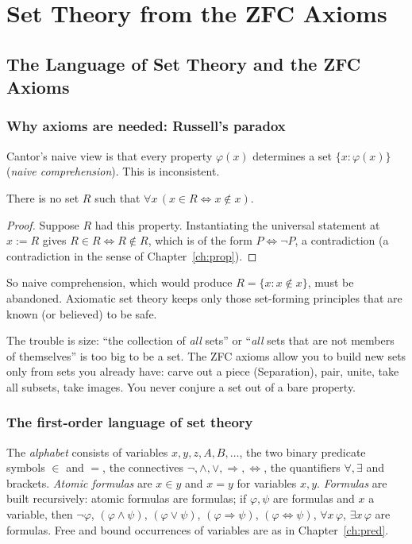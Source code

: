 \part{Set Theory from the ZFC Axioms}

\chapter{The Language of Set Theory and the ZFC Axioms}\label{ch:language}

\section{Why axioms are needed: Russell's paradox}

Cantor's naive view is that every property $\varphi(x)$ determines a set $\{x:\varphi(x)\}$ (\emph{naive comprehension}). This is inconsistent.

\begin{theorem}[Russell]\label{thm:russell}
	There is no set $R$ such that $\forall x\,(x\in R\Leftrightarrow x\notin x)$.
\end{theorem}
\begin{proof}
	Suppose $R$ had this property. Instantiating the universal statement at $x:=R$ gives $R\in R\Leftrightarrow R\notin R$, which is of the form $P\Leftrightarrow\neg P$, a contradiction (a contradiction in the sense of Chapter~\ref{ch:prop}).
\end{proof}

So naive comprehension, which would produce $R=\{x:x\notin x\}$, must be abandoned. Axiomatic set theory keeps only those set-forming principles that are known (or believed) to be safe.

\begin{intuition}
	The trouble is size: ``the collection of \emph{all} sets'' or ``\emph{all} sets that are not members of themselves'' is too big to be a set. The ZFC axioms allow you to build new sets only from sets you already have: carve out a piece (Separation), pair, unite, take all subsets, take images. You never conjure a set out of a bare property.
\end{intuition}

\section{The first-order language of set theory}

\begin{definition}
	The \emph{alphabet} consists of variables $x,y,z,A,B,\dots$, the two binary predicate symbols $\in$ and $=$, the connectives $\neg,\wedge,\vee,\Rightarrow,\Leftrightarrow$, the quantifiers $\forall,\exists$ and brackets. \emph{Atomic formulas} are $x\in y$ and $x=y$ for variables $x,y$. \emph{Formulas} are built recursively: atomic formulas are formulas; if $\varphi,\psi$ are formulas and $x$ a variable, then $\neg\varphi$, $(\varphi\wedge\psi)$, $(\varphi\vee\psi)$, $(\varphi\Rightarrow\psi)$, $(\varphi\Leftrightarrow\psi)$, $\forall x\,\varphi$, $\exists x\,\varphi$ are formulas. Free and bound occurrences of variables are as in Chapter~\ref{ch:pred}.
\end{definition}

